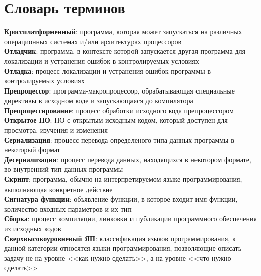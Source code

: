 \chapter*{Словарь терминов}             %
\textbf{Кроссплатформенный}: программа, которая может запускаться на различных операционных системах и/или архитектурах процессоров           \\
\textbf{Отладчик}: программа, в контексте которой запускается другая программа для локализации и устранения ошибок
в контролируемых условиях                                                                                                                     \\
\textbf{Отладка}: процесс локализации и устранения ошибок программы в контролируемых условиях                                                 \\
\textbf{Препроцессор}: программа-макропроцессор, обрабатывающая специальные директивы в исходном коде и запускающаяся до компилятора          \\
\textbf{Препроцессирование}: процесс обработки исходного кода препроцессором                                                                  \\
\textbf{Открытое ПО}: ПО с открытым исходным кодом, который доступен для просмотра, изучения и изменения                                      \\
\textbf{Сериализация}: процесс перевода определеного типа данных программы в некоторый формат                                                 \\
\textbf{Десериализация}: процесс перевода данных, находящихся в некотором формате, во внутренний тип данных программы                         \\
\textbf{Скрипт}: программа, обычно на интерпретируемом языке программирования, выполняющая конкретное действие                                \\
\textbf{Сигнатура функции}: объявление функции, в которое входит имя функции, количество входных параметров и их тип                          \\
\textbf{Сборка}: процесс компиляции, линковки и публикации программного обеспечения из исходных кодов                                         \\
\textbf{Сверхвысокоуровневый ЯП}: классификация языков программирования, к данной категории относятся языки программирования,
позволяющие описать задачу не на уровне <<как нужно сделать>>, а на уровне <<что нужно сделать>>                                              \\
